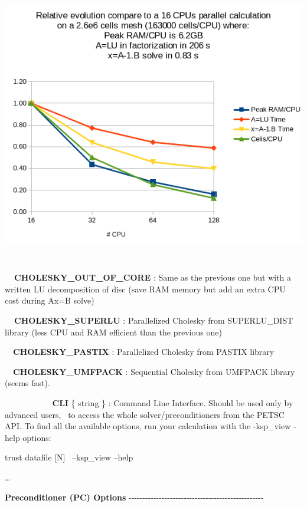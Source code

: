 \begin{center}
\includegraphics[width=15.212cm,height=12.266cm]{petsc_graph.png}
\end{center}
\textbf{\ \ CHOLESKY\_OUT\_OF\_CORE }: Same as the previous one but with a written LU decomposition of disc (save RAM
memory but add an extra CPU cost during Ax=B solve)

\textbf{\ \ CHOLESKY\_SUPERLU }: Parallelized Cholesky from SUPERLU\_DIST library (less CPU and RAM
efficient than the previous one) 

\ \ \textbf{CHOLESKY\_PASTIX} : Parallelized Cholesky from PASTIX library

\ \ \textbf{CHOLESKY\_UMFPACK} : Sequential Cholesky from UMFPACK library (seems fast).

\textbf{\ \ \ \ \ \ \ \ \ \ CLI }\{ string \} : Command Line Interface. Should be used only by advanced
users, \ to access the whole solver/preconditioners from the PETSC API. To find all the available options, run your
calculation with the -ksp\_view -help options:


\bigskip

trust datafile [N] \ {}--ksp\_view --help

{\dots}

\textbf{Preconditioner (PC) Options}
-{}-{}-{}-{}-{}-{}-{}-{}-{}-{}-{}-{}-{}-{}-{}-{}-{}-{}-{}-{}-{}-{}-{}-{}-{}-{}-{}-{}-{}-{}-{}-{}-{}-{}-{}-{}-{}-{}-{}-{}-{}-{}-{}-{}-{}-{}-{}-{}-

